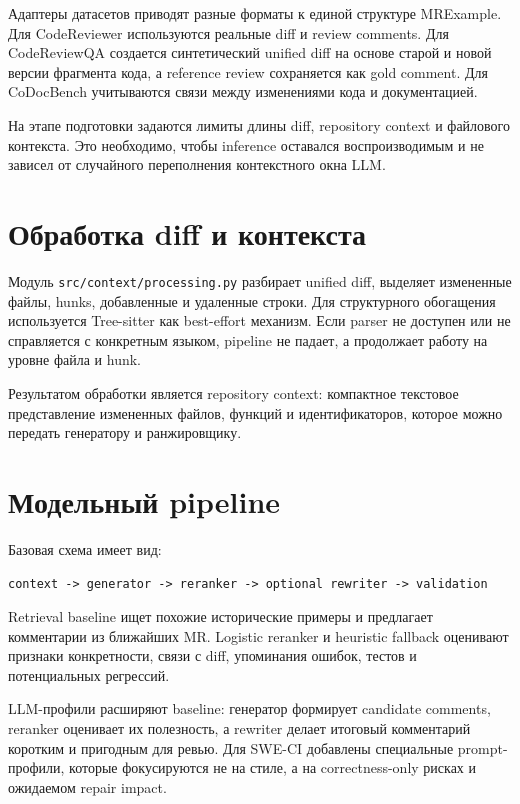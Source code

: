 \documentclass[14pt,a4paper]{extreport}
\begin{document}
Адаптеры датасетов приводят разные форматы к единой структуре MRExample.
Для CodeReviewer используются реальные diff и review comments. Для
CodeReviewQA создается синтетический unified diff на основе старой и новой
версии фрагмента кода, а reference review сохраняется как gold comment. Для
CoDocBench учитываются связи между изменениями кода и документацией.

На этапе подготовки задаются лимиты длины diff, repository context и файлового
контекста. Это необходимо, чтобы inference оставался воспроизводимым и не
зависел от случайного переполнения контекстного окна LLM.

\section{Обработка diff и контекста}

Модуль \texttt{src/context/processing.py} разбирает unified diff, выделяет
измененные файлы, hunks, добавленные и удаленные строки. Для структурного
обогащения используется Tree-sitter как best-effort механизм. Если parser не
доступен или не справляется с конкретным языком, pipeline не падает, а
продолжает работу на уровне файла и hunk.

Результатом обработки является repository context: компактное текстовое
представление измененных файлов, функций и идентификаторов, которое можно
передать генератору и ранжировщику.

\section{Модельный pipeline}

Базовая схема имеет вид:

\begin{center}
\texttt{context -> generator -> reranker -> optional rewriter -> validation}
\end{center}

Retrieval baseline ищет похожие исторические примеры и предлагает комментарии
из ближайших MR. Logistic reranker и heuristic fallback оценивают признаки
конкретности, связи с diff, упоминания ошибок, тестов и потенциальных
регрессий.

LLM-профили расширяют baseline: генератор формирует candidate comments,
reranker оценивает их полезность, а rewriter делает итоговый комментарий
коротким и пригодным для ревью. Для SWE-CI добавлены специальные prompt-профили,
которые фокусируются не на стиле, а на correctness-only рисках и ожидаемом
repair impact.
\end{document}
